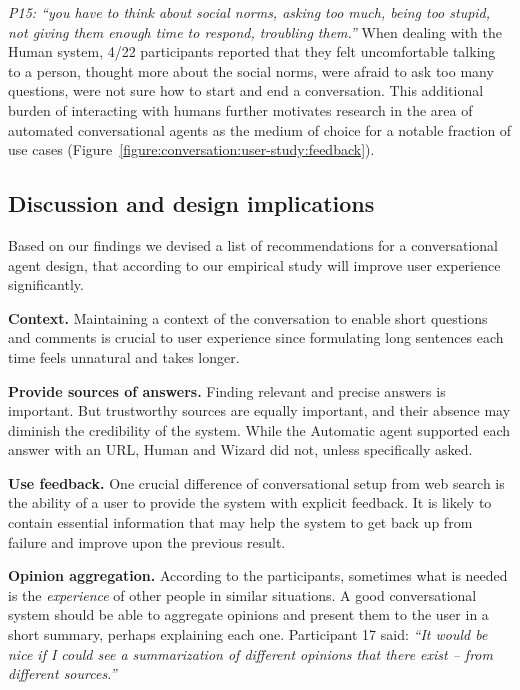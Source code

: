 \textit{P15: ``you have to think about social norms, asking too much, being too stupid, not giving them enough time to respond, troubling them.''} When dealing with the Human system, 4/22 participants reported that they felt uncomfortable talking to a person, thought more about the social norms, were afraid to ask too many questions, were not sure how to start and end a conversation. This additional burden of interacting with humans further motivates research in the area of automated conversational agents as the medium of choice for a notable fraction of use cases (Figure~\ref{figure:conversation:user-study:feedback}).


\subsection{Discussion and design implications}
\label{section:conversation:user-study:discussion}

Based on our findings we devised a list of recommendations for a conversational agent design, that according to our empirical study will improve user experience significantly.

\textbf{Context.}
Maintaining a context of the conversation to enable short questions and comments is crucial to user experience since formulating long sentences each time feels unnatural and takes longer.

\textbf{Provide sources of answers.}
Finding relevant and precise answers is important. But trustworthy sources are equally important, and their absence may diminish the credibility of the system. While the Automatic agent supported each answer with an URL, Human and Wizard did not, unless specifically asked. 

\textbf{Use feedback.}
One crucial difference of conversational setup from web search is the ability of a user to provide the system with explicit feedback. It is likely to contain essential information that may help the system to get back up from failure and improve upon the previous result. 

\textbf{Opinion aggregation.}
According to the participants, sometimes what is needed is the \textit{experience} of other people in similar situations.
A good conversational system should be able to aggregate opinions and present them to the user in a short summary, perhaps explaining each one. 
Participant 17 said: \textit{``It would be nice if I could see a summarization of different opinions that there exist -- from different sources.''}


